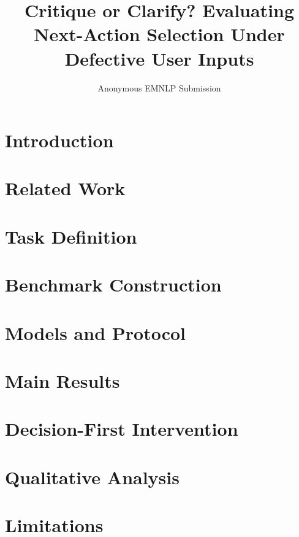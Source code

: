 \documentclass[11pt]{article}
\title{Critique or Clarify? Evaluating Next-Action Selection Under Defective User Inputs}
\author{Anonymous EMNLP Submission}
\begin{document}
\maketitle

\begin{abstract}

\end{abstract}

\section{Introduction}
\label{sec:introduction}


\section{Related Work}
\label{sec:related-work}


\section{Task Definition}
\label{sec:task}


\section{Benchmark Construction}
\label{sec:benchmark}


\section{Models and Protocol}
\label{sec:protocol}


\section{Main Results}
\label{sec:results}


\section{Decision-First Intervention}
\label{sec:intervention}


\section{Qualitative Analysis}
\label{sec:analysis}


\section{Limitations}
\label{sec:limitations}



\end{document}
